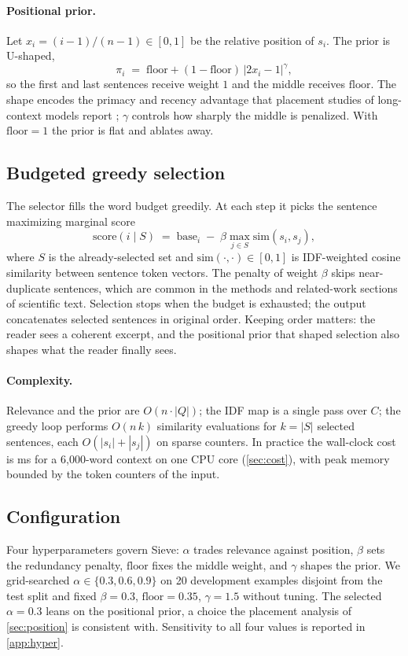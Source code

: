 \documentclass{article}
\newcommand{\method}{Sieve}
\begin{document}
\paragraph{Positional prior.}
Let $x_i=(i-1)/(n-1)\in[0,1]$ be the relative position of $s_i$. The
prior is U-shaped,
\begin{equation}
\label{eq:pos}
\pi_i \;=\; \mathrm{floor} + (1-\mathrm{floor})\,
\lvert 2x_i - 1\rvert^{\gamma},
\end{equation}
so the first and last sentences receive weight $1$ and the middle
receives $\mathrm{floor}$. The shape encodes the primacy and recency
advantage that placement studies of long-context models report
\citep{liu2023lost}; $\gamma$ controls how sharply the middle is
penalized. With $\mathrm{floor}=1$ the prior is flat and ablates away.

\subsection{Budgeted greedy selection}
The selector fills the word budget greedily. At each step it picks the
sentence maximizing marginal score
\begin{equation}
\label{eq:mmr}
\mathrm{score}(i \mid S) \;=\; \mathrm{base}_i
\;-\; \beta \max_{j \in S} \mathrm{sim}(s_i, s_j),
\end{equation}
where $S$ is the already-selected set and
$\mathrm{sim}(\cdot,\cdot)\in[0,1]$ is IDF-weighted cosine similarity
between sentence token vectors. The penalty of weight $\beta$ skips
near-duplicate sentences, which are common in the methods and
related-work sections of scientific text. Selection stops when the budget
is exhausted; the output concatenates selected sentences in original
order. Keeping order matters: the reader sees a coherent excerpt, and
the positional prior that shaped selection also shapes what the reader
finally sees.

\paragraph{Complexity.}
Relevance and the prior are $O(n\cdot|Q|)$; the IDF map is a single pass
over $C$; the greedy loop performs $O(n\,k)$ similarity evaluations for
$k=|S|$ selected sentences, each $O(|s_i|+|s_j|)$ on sparse counters. In
practice the wall-clock cost is \TimeSieveSixk{} ms for a 6{,}000-word
context on one CPU core (\autoref{sec:cost}), with peak memory bounded by
the token counters of the input.

\subsection{Configuration}
Four hyperparameters govern \method{}: $\alpha$ trades relevance against
position, $\beta$ sets the redundancy penalty, $\mathrm{floor}$ fixes the
middle weight, and $\gamma$ shapes the prior. We grid-searched
$\alpha \in \{0.3, 0.6, 0.9\}$ on 20 development examples disjoint from
the test split and fixed $\beta=0.3$, $\mathrm{floor}=0.35$,
$\gamma=1.5$ without tuning. The selected $\alpha=0.3$ leans on the
positional prior, a choice the placement analysis of
\autoref{sec:position} is consistent with. Sensitivity to all four values
is reported in \autoref{app:hyper}.
\end{document}
